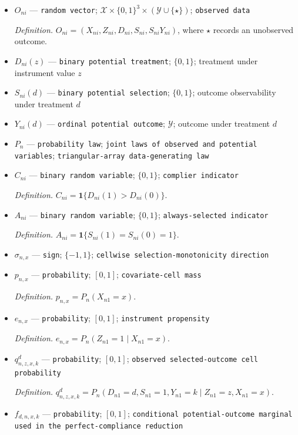 \documentclass{article}
\begin{document}
\begin{itemize}
  \item \(O_{ni}\) --- \texttt{random vector}; \(\mathcal X\times\{0,1\}^{3}\times(\mathcal Y\cup\{\star\})\); \texttt{observed data}
  \par\smallskip\noindent\emph{Definition.} \(O_{ni}=(X_{ni},Z_{ni},D_{ni},S_{ni},S_{ni}Y_{ni})\), where \(\star\) records an unobserved outcome.
  \item \(D_{ni}(z)\) --- \texttt{binary potential treatment}; \(\{0,1\}\); treatment under instrument value \(z\)
  \item \(S_{ni}(d)\) --- \texttt{binary potential selection}; \(\{0,1\}\); outcome observability under treatment \(d\)
  \item \(Y_{ni}(d)\) --- \texttt{ordinal potential outcome}; \(\mathcal Y\); outcome under treatment \(d\)
  \item \(P_n\) --- \texttt{probability law}; \texttt{joint laws of observed and potential variables}; \texttt{triangular-\allowbreak{}array data-\allowbreak{}generating law}
  \item \(C_{ni}\) --- \texttt{binary random variable}; \(\{0,1\}\); \texttt{complier indicator}
  \par\smallskip\noindent\emph{Definition.} \(C_{ni}=\mathbf 1\{D_{ni}(1)>D_{ni}(0)\}\).
  \item \(A_{ni}\) --- \texttt{binary random variable}; \(\{0,1\}\); \texttt{always-\allowbreak{}selected indicator}
  \par\smallskip\noindent\emph{Definition.} \(A_{ni}=\mathbf 1\{S_{ni}(1)=S_{ni}(0)=1\}\).
  \item \(\sigma_{n,x}\) --- \texttt{sign}; \(\{-1,1\}\); \texttt{cellwise selection-\allowbreak{}monotonicity direction}
  \item \(p_{n,x}\) --- \texttt{probability}; \([0,1]\); \texttt{covariate-\allowbreak{}cell mass}
  \par\smallskip\noindent\emph{Definition.} \(p_{n,x}=P_n(X_{n1}=x)\).
  \item \(e_{n,x}\) --- \texttt{probability}; \([0,1]\); \texttt{instrument propensity}
  \par\smallskip\noindent\emph{Definition.} \(e_{n,x}=P_n(Z_{n1}=1\mid X_{n1}=x)\).
  \item \(q^{d}_{n,z,x,k}\) --- \texttt{probability}; \([0,1]\); \texttt{observed selected-\allowbreak{}outcome cell probability}
  \par\smallskip\noindent\emph{Definition.} \(q^{d}_{n,z,x,k}=P_n(D_{n1}=d,S_{n1}=1,Y_{n1}=k\mid Z_{n1}=z,X_{n1}=x)\).
  \item \(f_{d,n,x,k}\) --- \texttt{probability}; \([0,1]\); \texttt{conditional potential-\allowbreak{}outcome marginal used in the perfect-\allowbreak{}compliance reduction}

\end{itemize}
\end{document}
